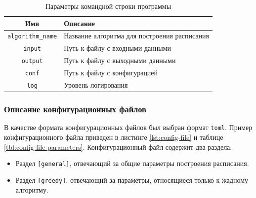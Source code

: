 \begin{table}[!htbp]
    \centering
    \begin{tabularx}{\textwidth}{|c|X|}
        \hline
        Имя                      & Описание                                     \\
        \hline
        \texttt{algorithm\_name} & Название алгоритма для построения расписания \\
        \hline
        \texttt{input}           & Путь к файлу с входными данными              \\
        \hline
        \texttt{output}          & Путь к файлу с выходными данными             \\
        \hline
        \texttt{conf}            & Путь к файлу с конфигурацией                 \\
        \hline
        \texttt{log}             & Уровень логирования                          \\
        \hline
    \end{tabularx}
    \caption{Параметры командной строки программы}
    \label{tbl:command-line-parameters}
\end{table}
\subsubsection{Описание конфигурационных файлов}
В качестве формата конфигурационных файлов был выбран формат \texttt{toml}. Пример конфигурационного файла приведен в листинге \ref{lst:config-file} и таблице \ref{tbl:config-file-parameters}. Конфигурационный файл содержит два раздела:
\begin{itemize}
    \item Раздел \texttt{[general]}, отвечающий за общие параметры построения расписания.
    \item Раздел \texttt{[greedy]}, отвечающий за параметры, относящиеся только к жадному алгоритму.
\end{itemize}


